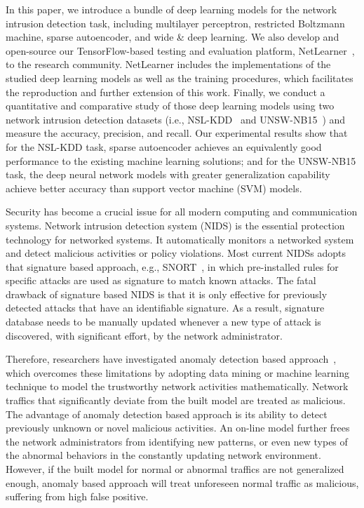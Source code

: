 In this paper, we introduce a bundle of deep learning models for the network intrusion detection task,
including multilayer perceptron, restricted Boltzmann machine, sparse autoencoder, and wide \& deep learning.
We also develop and open-source our TensorFlow-based testing and evaluation platform, NetLearner~\cite{NetLearner}, to the research community.
NetLearner includes the implementations of the studied deep learning models as well as the training procedures,
which facilitates the reproduction and further extension of this work.
Finally, we conduct a quantitative and comparative study of those deep learning models using two network intrusion detection datasets
(i.e., NSL-KDD~\cite{NSL-KDD} and UNSW-NB15~\cite{UNSW}) and measure the accuracy, precision, and recall.
Our experimental results show that for the NSL-KDD task, sparse autoencoder achieves an equivalently good performance to the existing machine learning solutions;
and for the UNSW-NB15 task, the deep neural network models with greater generalization capability achieve better accuracy than support vector machine (SVM) models.

Security has become a crucial issue for all modern computing and communication systems.
Network intrusion detection system (NIDS) is the essential protection technology for networked systems.
It automatically monitors a networked system and detect malicious activities or policy violations.
Most current NIDSs adopts that signature based approach, e.g., SNORT~\cite{Snort}, in which
pre-installed rules for specific attacks are used as signature to match known attacks.
The fatal drawback of signature based NIDS is that
it is only effective for previously detected attacks that have an identifiable signature.
As a result, signature database needs to be manually updated whenever a new type of attack
is discovered, with significant effort, by the network administrator.

Therefore, researchers have investigated anomaly detection based approach~\cite{STL-NIDS, LOF, RankingOutliner, NB-Tree, RampLossKSVCR, GAA-ADS},
which overcomes these limitations by adopting data mining or machine learning technique to
model the trustworthy network activities mathematically.
Network traffics that significantly deviate from the built model are treated as malicious.
The advantage of anomaly detection based approach is its ability to detect previously unknown or novel malicious activities.
An on-line model further frees the network administrators from identifying new patterns,
or even new types of the abnormal behaviors in the constantly updating network environment.
However, if the built model for normal or abnormal traffics are not generalized enough,
anomaly based approach will treat unforeseen normal traffic as malicious,
suffering from high false positive.

